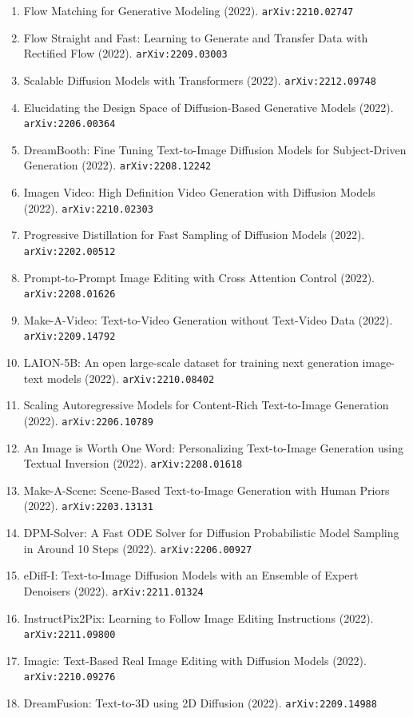 \documentclass[11pt]{article}
\begin{document}
\begin{enumerate}
  \item Flow Matching for Generative Modeling (2022). \texttt{arXiv:2210.02747}
  \item Flow Straight and Fast: Learning to Generate and Transfer Data with Rectified Flow (2022). \texttt{arXiv:2209.03003}
  \item Scalable Diffusion Models with Transformers (2022). \texttt{arXiv:2212.09748}
  \item Elucidating the Design Space of Diffusion-Based Generative Models (2022). \texttt{arXiv:2206.00364}
  \item DreamBooth: Fine Tuning Text-to-Image Diffusion Models for Subject-Driven Generation (2022). \texttt{arXiv:2208.12242}
  \item Imagen Video: High Definition Video Generation with Diffusion Models (2022). \texttt{arXiv:2210.02303}
  \item Progressive Distillation for Fast Sampling of Diffusion Models (2022). \texttt{arXiv:2202.00512}
  \item Prompt-to-Prompt Image Editing with Cross Attention Control (2022). \texttt{arXiv:2208.01626}
  \item Make-A-Video: Text-to-Video Generation without Text-Video Data (2022). \texttt{arXiv:2209.14792}
  \item LAION-5B: An open large-scale dataset for training next generation image-text models (2022). \texttt{arXiv:2210.08402}
  \item Scaling Autoregressive Models for Content-Rich Text-to-Image Generation (2022). \texttt{arXiv:2206.10789}
  \item An Image is Worth One Word: Personalizing Text-to-Image Generation using Textual Inversion (2022). \texttt{arXiv:2208.01618}
  \item Make-A-Scene: Scene-Based Text-to-Image Generation with Human Priors (2022). \texttt{arXiv:2203.13131}
  \item DPM-Solver: A Fast ODE Solver for Diffusion Probabilistic Model Sampling in Around 10 Steps (2022). \texttt{arXiv:2206.00927}
  \item eDiff-I: Text-to-Image Diffusion Models with an Ensemble of Expert Denoisers (2022). \texttt{arXiv:2211.01324}
  \item InstructPix2Pix: Learning to Follow Image Editing Instructions (2022). \texttt{arXiv:2211.09800}
  \item Imagic: Text-Based Real Image Editing with Diffusion Models (2022). \texttt{arXiv:2210.09276}
  \item DreamFusion: Text-to-3D using 2D Diffusion (2022). \texttt{arXiv:2209.14988}

\end{enumerate}
\end{document}
